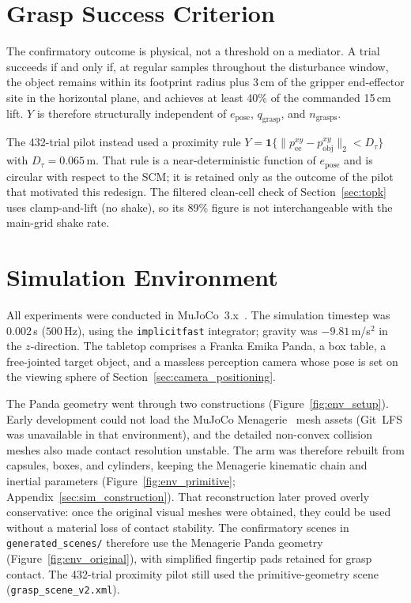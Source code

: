 \documentclass[11pt,a4paper]{report}
\begin{document}
\section{Grasp Success Criterion}
\label{sec:success_criterion_detail}

The confirmatory outcome is physical, not a threshold on a mediator. A trial succeeds if and only if, at regular samples throughout the disturbance window, the object remains within its footprint radius plus 3\,cm of the gripper end-effector site in the horizontal plane, and achieves at least 40\% of the commanded 15\,cm lift. $Y$ is therefore structurally independent of $e_{\text{pose}}$, $q_{\text{grasp}}$, and $n_{\text{grasps}}$.

The 432-trial pilot instead used a proximity rule $Y=\mathbf{1}\{\|p_{\text{ee}}^{xy}-p_{\text{obj}}^{xy}\|_2 < D_\tau\}$ with $D_\tau=0.065$\,m. That rule is a near-deterministic function of $e_{\text{pose}}$ and is circular with respect to the SCM; it is retained only as the outcome of the pilot that motivated this redesign. The filtered clean-cell check of Section~\ref{sec:topk} uses clamp-and-lift (no shake), so its 89\% figure is not interchangeable with the main-grid shake rate.

\section{Simulation Environment}
\label{sec:sim_env}

All experiments were conducted in MuJoCo~3.x~\cite{todorov2012mujoco}. The simulation timestep was $0.002$\,s ($500$\,Hz), using the \texttt{implicitfast} integrator; gravity was $-9.81$\,m/s$^2$ in the $z$-direction. The tabletop comprises a Franka Emika Panda, a box table, a free-jointed target object, and a massless perception camera whose pose is set on the viewing sphere of Section~\ref{sec:camera_positioning}.

The Panda geometry went through two constructions (Figure~\ref{fig:env_setup}). Early development could not load the MuJoCo Menagerie~\cite{menagerie2022} mesh assets (Git~LFS was unavailable in that environment), and the detailed non-convex collision meshes also made contact resolution unstable. The arm was therefore rebuilt from capsules, boxes, and cylinders, keeping the Menagerie kinematic chain and inertial parameters (Figure~\ref{fig:env_primitive}; Appendix~\ref{sec:sim_construction}). That reconstruction later proved overly conservative: once the original visual meshes were obtained, they could be used without a material loss of contact stability. The confirmatory scenes in \texttt{generated\_scenes/} therefore use the Menagerie Panda geometry (Figure~\ref{fig:env_original}), with simplified fingertip pads retained for grasp contact. The 432-trial proximity pilot still used the primitive-geometry scene (\texttt{grasp\_scene\_v2.xml}).
\end{document}

